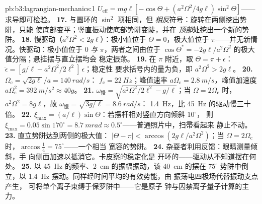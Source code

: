 \begin{solution}{pb:b3:lagrangian-mechanics:1}
$U_{\text{eff}} = mg\ell[-\cos\Theta + (a^2\Omega^2/4g\ell)
\sin^2\Theta]$——求导即可检验。
\textbf{17.} 与圆环的 $\sin^2$ 项相同，但
\emph{相反}符号：旋转在两侧挖出势阱，只能
使底部变平；竖直振动使底部势阱变陡，并在
\emph{顶部}处挖出一个新的势阱。
\textbf{18.} 慢驱动（$a^2\Omega^2 < 2g\ell$）：极小值位于 $\Theta =
0$，极大值位于 $\pi$——并无新情况。快驱动：极小值位于 $0$
\emph{与} $\pi$，两者之间由位于 $\cos\Theta^* =
-2g\ell/a^2\Omega^2$ 的极大值分隔；悬挂摆与直立摆均会
稳定振荡。
\textbf{19.} 在 $\pi$ 附近，取 $\Theta = \pi + \epsilon$：
$\ddot\epsilon = [g/\ell - a^2\Omega^2/2\ell^2]\,\epsilon$；稳定性
要求括号内的量为负，即 $a^2\Omega^2 > 2g\ell$。
\textbf{20.} $\Omega_{\text{c}} = \sqrt{2g\ell}/a = \qty{140}{rad/s}$：
$f_{\text{c}} = \qty{22}{Hz}$；峰值速率 $a\Omega_{\text{c}} =
\qty{2.8}{m/s}$，峰值加速度 $a\Omega_{\text{c}}^2 =
\qty{392}{m/s^2} \approx 40g$。
\textbf{21.} $\omega_{\text{慢}} = \sqrt{a^2\Omega^2/2\ell^2 -
g/\ell}$；当 $\Omega = 2\Omega_{\text{c}}$ 时，$a^2\Omega^2 = 8g\ell$，故
$\omega_{\text{慢}} = \sqrt{3g/\ell} = \qty{8.6}{rad/s}$：
\qty{1.4}{Hz}，比 \qty{45}{Hz} 的驱动慢三十倍。
\textbf{22.} $\xi_{\max} = (a/\ell)\sin\Theta$：若摆杆相对竖直方向倾斜 $10^\circ$，
则 $\xi_{\max} = 0.05\sin170^\circ = \qty{8.7}{mrad}
\approx 0.5^\circ$——普通照片中，扫帚看起来
静止不动。
\textbf{23.} 直立势阱达到两侧的极大值：
$|\Theta - \pi| < \arccos(2g\ell/a^2\Omega^2)$；当 $\Omega =
2\Omega_{\text{c}}$ 时，$\arccos\tfrac14 = 75^\circ$——一个相当
宽容的势阱。
\textbf{24.} 杂耍者利用反馈：眼睛测量倾斜，手
向侧面加速以抵消它。卡皮察的稳定化是
开环的——驱动从不知道摆在何处。
\textbf{25.} 以 \qty{45}{Hz} 的频率、\qty{2}{cm} 的振幅振动，该
\qty{40}{cm} 的摆在 $75^\circ$ 势阱中倒立，以
\qty{1.4}{Hz} 摆动。同样经时间平均的有效势能，由
振荡电四极场代替振动支点产生，
可将单个离子束缚于保罗阱中——它是原子
钟与囚禁离子量子计算的主力。
\end{solution}
